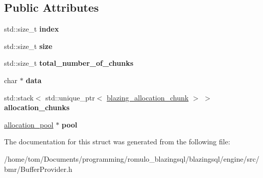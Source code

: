 \subsection*{Public Attributes}
\begin{DoxyCompactItemize}
\item 
\mbox{\label{structral_1_1memory_1_1blazing__allocation_a5ba48f9dbefe7e168f957ad776ba3d6a}} 
std\+::size\+\_\+t {\bfseries index}
\item 
\mbox{\label{structral_1_1memory_1_1blazing__allocation_a04163d566f783651e8a093e629042cf6}} 
std\+::size\+\_\+t {\bfseries size}
\item 
\mbox{\label{structral_1_1memory_1_1blazing__allocation_abacfe2133dc90c845045f64ebc3b03d4}} 
std\+::size\+\_\+t {\bfseries total\+\_\+number\+\_\+of\+\_\+chunks}
\item 
\mbox{\label{structral_1_1memory_1_1blazing__allocation_a51939ae7368dcde54ee8b8626ff16713}} 
char $\ast$ {\bfseries data}
\item 
\mbox{\label{structral_1_1memory_1_1blazing__allocation_a761301a5413f8aa71c24ee194a89475b}} 
std\+::stack$<$ std\+::unique\+\_\+ptr$<$ \hyperlink{structral_1_1memory_1_1blazing__allocation__chunk}{blazing\+\_\+allocation\+\_\+chunk} $>$ $>$ {\bfseries allocation\+\_\+chunks}
\item 
\mbox{\label{structral_1_1memory_1_1blazing__allocation_add70b43fb60a63a7539134cb8cffa9bd}} 
\hyperlink{classral_1_1memory_1_1allocation__pool}{allocation\+\_\+pool} $\ast$ {\bfseries pool}
\end{DoxyCompactItemize}


The documentation for this struct was generated from the following file\+:\begin{DoxyCompactItemize}
\item 
/home/tom/\+Documents/programming/romulo\+\_\+blazingsql/blazingsql/engine/src/bmr/Buffer\+Provider.\+h\end{DoxyCompactItemize}
